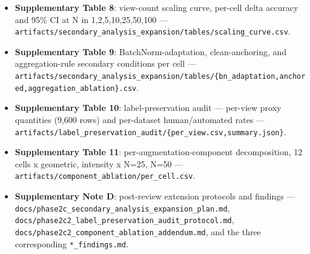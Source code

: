 \begin{itemize}
  \item \textbf{Supplementary Table 8}: view-count scaling curve, per-cell delta accuracy and 95\% CI at N in {1,2,5,10,25,50,100} --- \texttt{artifacts/\allowbreak secondary\_\allowbreak analysis\_\allowbreak expansion/\allowbreak tables/\allowbreak scaling\_\allowbreak curve.csv}.
  \item \textbf{Supplementary Table 9}: BatchNorm-adaptation, clean-anchoring, and aggregation-rule secondary conditions per cell --- \texttt{artifacts/\allowbreak secondary\_\allowbreak analysis\_\allowbreak expansion/\allowbreak tables/\allowbreak \{bn\_\allowbreak adaptation,anchored,aggregation\_\allowbreak ablation\}.csv}.
  \item \textbf{Supplementary Table 10}: label-preservation audit --- per-view proxy quantities (9,600 rows) and per-dataset human/automated rates --- \texttt{artifacts/\allowbreak label\_\allowbreak preservation\_\allowbreak audit/\allowbreak \{per\_\allowbreak view.csv,summary.json\}}.
  \item \textbf{Supplementary Table 11}: per-augmentation-component decomposition, 12 cells x {geometric, intensity} x {N=25, N=50} --- \texttt{artifacts/\allowbreak component\_\allowbreak ablation/\allowbreak per\_\allowbreak cell.csv}.
  \item \textbf{Supplementary Note D}: post-review extension protocols and findings --- \texttt{docs/\allowbreak phase2c\_\allowbreak secondary\_\allowbreak analysis\_\allowbreak expansion\_\allowbreak plan.md}, \texttt{docs/\allowbreak phase2c2\_\allowbreak label\_\allowbreak preservation\_\allowbreak audit\_\allowbreak protocol.md}, \texttt{docs/\allowbreak phase2c2\_\allowbreak component\_\allowbreak ablation\_\allowbreak addendum.md}, and the three corresponding \texttt{*\_\allowbreak findings.md}.
\end{itemize}
